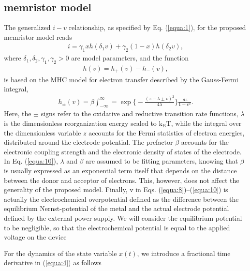 \documentclass[10pt]{article}
\begin{document}
\begin{multicols}{2}
{        \section{\sc \bfseries memristor model}
        }
        The generalized $i-v$ relationship, as specified by Eq. (\ref{equa:1}), for the proposed memristor model reads
        \begin{align}
            i = \gamma _1 x h(\delta _1 v) + \gamma _2(1 - x) h (\delta _2 v), \label{equa:8}
        \end{align}
        where $\delta _1, \delta _2, \gamma _1, \gamma _2 > 0$ are model parameters, and the function
        \begin{align}{}
            h (v) = h_+ (v) - h_- (v), \label{equa:9}
        \end{align}
        is based on the MHC model for electron transfer described by the Gauss-Fermi integral,
        \begin{align}
            h_\pm (v) = \beta \int_{-\infty}^\infty = \exp{\biggl\{ -\frac{(z - \lambda \pm v)^2}{4 \lambda} \biggr\} } \frac{\,dz}{1+e^z}. \label{equa:10}
        \end{align}
        Here, the $\pm$ signs refer to the oxidative and reductive transition rate functions, $\lambda$ is the dimensionless reorganization energy scaled to $\text{k}_\text{B}\text{T}$, while the integral over the dimensionless variable $z$ accounts for the Fermi statistics of electron energies, distributed around the electrode
        potential. The prefactor $\beta$ accounts for the electronic coupling strength and the electronic density of states of the electrode. In Eq. (\ref{equa:10}), $\lambda$ and $\beta$ are assumed to be fitting parameters, knowing that $\beta$ is usually expressed
        as an exponential term itself that depends on the distance between the donor and acceptor of electrons. This, however, does not affect the generality of the proposed
        model. Finally, v in Eqs. (\ref{equa:8})–(\ref{equa:10}) is actually the electrochemical overpotential defined as the difference between the equilibrium Nernst-potential of the metal and the actual electrode potential defined by the external power supply. We will consider the equilibrium potential to be negligible, so that the electrochemical potential is equal to the applied voltage on the device \par
        For the dynamics of the state variable $x(t)$, we introduce a fractional time derivative in (\ref{equa:4}) as follows
        \begin{align}

\end{align}
\end{multicols}
\end{document}
